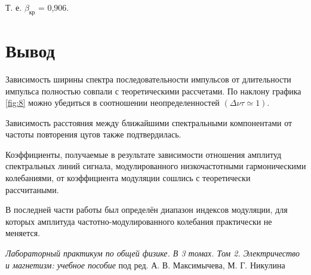 \documentclass[12pt,a4paper]{article}
\begin{document}
Т. е. $\beta_\text{кр}$ = 0,906.

\newpage

\section*{Вывод}

Зависимость ширины спектра последовательности импульсов от длительности импульса полностью совпали с теоретическими рассчетами. По наклону графика \ref{fig:8} можно убедиться в соотношении неопределенностей $(\Delta \nu \tau \simeq 1)$.
 
Зависимость расстояния между ближайшими 
спектральными компонентами от частоты повторения цугов 
также подтвердилась. 

Коэффициенты, получаемые в результате зависимости отношения амплитуд спектральных линий сигнала, модулированного низкочастотными гармоническими колебаниями, от коэффициента модуляции сошлись с теоретически рассчитаными. 

В последней части работы был определён диапазон индексов модуляции, для которых амплитуда частотно-модулированного колебания практически не меняется.


\begin{thebibliography}{9}
	 \emph{Лабораторный практикум по общей физике. В 3 томах. Том 2. Электричество и магнетизм: учебное пособие} под ред. А. В. Максимычева, М. Г. Никулина
\end{thebibliography}
\end{document}
